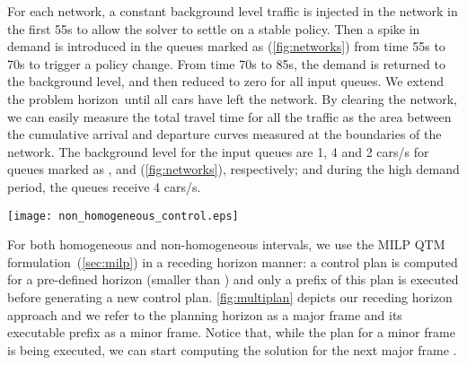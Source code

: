 For each network, a constant background level traffic is injected in the network
in the first 55s to allow the solver to settle on a stable policy.
%
Then a spike in demand is introduced in the queues marked as \qVarTraf
(\cref{fig:networks}) from time 55s to 70s to trigger a policy change.
%
%
From time 70s to 85s, the demand is returned to the background level, and then
reduced to zero for all input queues.
%
We extend the problem horizon~\TMAX until all cars have left the network.
%
By clearing the network, we can easily measure the total travel time for all the
traffic as the area between the cumulative arrival and departure curves measured
at the boundaries of the network.
%
%
The background level for the input queues are 1, 4 and 2 cars/s for queues
marked as \qLowTraf, \qHighTraf and \qVarTraf (\cref{fig:networks}),
respectively; and during the high demand period, the queues \qVarTraf receive 4
cars/s.




\begin{figure*}[t!]
\centering
\texttt{[image: non\_homogeneous\_control.eps]}
\caption{Receding horizon planning}
\label{fig:multiplan}
\end{figure*}


For both homogeneous and non-homogeneous intervals, we use the MILP QTM
formulation~(\cref{sec:milp}) in a receding horizon manner: a control plan is
computed for a pre-defined horizon (smaller than \TMAX) and only a prefix of
this plan is executed before generating a new control plan. 
%
\cref{fig:multiplan} depicts our receding horizon approach and we refer to the
planning horizon as a major frame and its executable prefix as a minor frame.
%
Notice that, while the plan for a minor frame is being executed, we can start
computing the solution for the next major frame .


